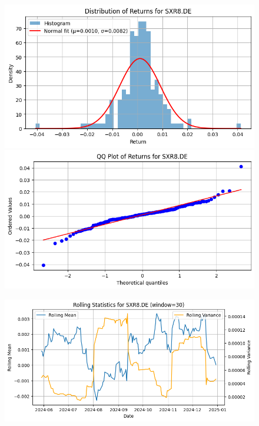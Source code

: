 \documentclass{article}%
\begin{document}
\begin{figure}[htbp]%
\begin{minipage}{0.49\textwidth}%
\includegraphics[width=\linewidth]{ticker_images/SXR8.DE_return_distribution.png}%
\end{minipage}%
\begin{minipage}{0.49\textwidth}%
\includegraphics[width=\linewidth]{ticker_images/SXR8.DE_qq_plot.png}%
\end{minipage}%
\end{figure}

%


\begin{figure}[htbp]%
\begin{minipage}{0.49\textwidth}%
\includegraphics[width=\linewidth]{ticker_images/SXR8.DE_rolling_stats.png}%
\end{minipage}%
\end{figure}
\end{document}
